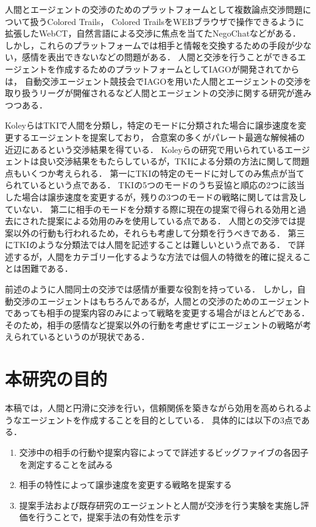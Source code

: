 人間とエージェントの交渉のためのプラットフォームとして複数論点交渉問題について扱うColored Trails\cite{ct}，
Colored TrailsをWEBブラウザで操作できるように拡張したWebCT\cite{webct}，自然言語による交渉に焦点を当てたNegoChat\cite{negochat}などがある．
しかし，これらのプラットフォームでは相手と情報を交換するための手段が少ない，感情を表出できないなどの問題がある\cite{pinocchio}．
人間と交渉を行うことができるエージェントを作成するためのプラットフォームとしてIAGO\cite{pinocchio, iago}が開発されてからは，
自動交渉エージェント競技会でIAGOを用いた人間とエージェントの交渉を取り扱うリーグが開催されるなど人間とエージェントの交渉に関する研究が進みつつある\cite{hal-2017, hal-2018, hal-2019}．

Koleyら\cite{tki-ha}はTKI\cite{tki}で人間を分類し，特定のモードに分類された場合に譲歩速度を変更するエージェントを提案しており，
合意案の多くがパレート最適な解候補の近辺にあるという交渉結果を得ている．
Koleyらの研究で用いられているエージェントは良い交渉結果をもたらしているが，TKIによる分類の方法に関して問題点もいくつか考えられる．
第一にTKIの特定のモードに対してのみ焦点が当てられているという点である．
TKIの5つのモードのうち妥協と順応の2つに該当した場合は譲歩速度を変更するが，残りの3つのモードの戦略に関しては言及していない．
第二に相手のモードを分類する際に現在の提案で得られる効用と過去にされた提案による効用のみを使用している点である．
人間との交渉では提案以外の行動も行われるため，それらも考慮して分類を行うべきである．
第三にTKIのような分類法では人間を記述することは難しいという点である．
で詳述するが，人間をカテゴリー化するような方法では個人の特徴を的確に捉えることは困難である．

前述のように人間同士の交渉では感情が重要な役割を持っている．
しかし，自動交渉のエージェントはもちろんであるが，人間との交渉のためのエージェントであっても相手の提案内容のみによって戦略を変更する場合がほとんどである．
そのため，相手の感情など提案以外の行動を考慮せずにエージェントの戦略が考えられているというのが現状である．

\section{本研究の目的}
本稿では，人間と円滑に交渉を行い，信頼関係を築きながら効用を高められるようなエージェントを作成することを目的としている．
具体的には以下の3点である．

\begin{enumerate}
    \item 交渉中の相手の行動や提案内容によってで詳述するビッグファイブの各因子を測定することを試みる
    \item 相手の特性によって譲歩速度を変更する戦略を提案する
    \item 提案手法および既存研究のエージェントと人間が交渉を行う実験を実施し評価を行うことで，提案手法の有効性を示す
\end{enumerate}

